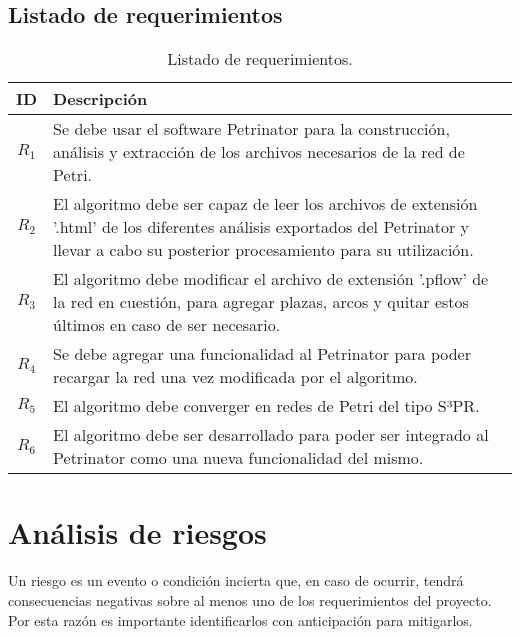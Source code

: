 \subsection{Listado de requerimientos}
\begin{table}[H]
    \centering
    \begin{tabular}{|c|p{12.8cm}|}
    \hline
    \textbf{ID} & \textbf{Descripción}  \\  \hline
    $R_{1}$ & Se debe usar el software Petrinator para la construcción, análisis y extracción de los archivos necesarios de la red de Petri.\\
    \hline
    
    $R_{2}$ & El algoritmo debe ser capaz de leer los archivos de extensión '.html' de los diferentes análisis exportados del Petrinator y llevar a cabo su posterior procesamiento para su utilización. \\ 
    \hline
    
    $R_{3}$ & El algoritmo debe modificar el archivo de extensión '.pflow' de la red en cuestión, para agregar plazas, arcos y quitar estos últimos en caso de ser necesario.\\
    \hline
    
    $R_{4}$ & Se debe agregar una funcionalidad al Petrinator para poder recargar la red una vez modificada por el algoritmo. \\ 
    \hline
    
    $R_{5}$ & El algoritmo debe converger en redes de Petri del tipo S³PR.  \\ 
    \hline
    
    $R_{6}$ & El algoritmo debe ser desarrollado para poder ser integrado al Petrinator como una nueva funcionalidad del mismo.  \\ 
    \hline
    
    \end{tabular}
    \label{tab:listadoRiesgos}
    \caption{Listado de requerimientos.}
\end{table}

\section{Análisis de riesgos}
Un riesgo es un evento o condición incierta que, en caso de ocurrir, tendrá consecuencias negativas sobre al menos uno de los requerimientos del proyecto. Por esta razón es importante identificarlos con anticipación para mitigarlos.

